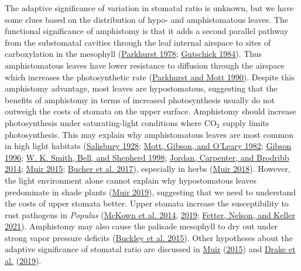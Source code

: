 \documentclass[
  10pt,
]{article}
\begin{document}
The adaptive significance of variation in stomatal ratio is unknown, but we have some clues based on the distribution of hypo- and amphistomatous leaves. The functional significance of amphistomy is that it adds a second parallel pathway from the substomatal cavities through the leaf internal airspace to sites of carboxylation in the mesophyll (\protect\hyperlink{ref-parkhurst_adaptive_1978}{Parkhurst 1978}; \protect\hyperlink{ref-gutschick_photosynthesis_1984}{Gutschick 1984}). Thus amphistomatous leaves have lower resistance to diffusion through the airspace which increases the photosynthetic rate (\protect\hyperlink{ref-parkhurst_intercellular_1990}{Parkhurst and Mott 1990}). Despite this amphistomy advantage, most leaves are hypostomatous, suggesting that the benefits of amphistomy in terms of increased photosynthesis usually do not outweigh the costs of stomata on the upper surface. Amphistomy should increase photosynthesis under saturating-light conditions where CO\(_2\) supply limits photosynthesis. This may explain why amphistomatous leaves are most common in high light habitats (\protect\hyperlink{ref-salisbury_i_1928}{Salisbury 1928}; \protect\hyperlink{ref-mott_adaptive_1982}{Mott, Gibson, and O'Leary 1982}; \protect\hyperlink{ref-gibson_structure-function_1996}{Gibson 1996}; \protect\hyperlink{ref-smith_associations_1998}{W. K. Smith, Bell, and Shepherd 1998}; \protect\hyperlink{ref-jordan_using_2014}{Jordan, Carpenter, and Brodribb 2014}; \protect\hyperlink{ref-muir_making_2015}{Muir 2015}; \protect\hyperlink{ref-bucher_stomatal_2017}{Bucher et al. 2017}), especially in herbs (\protect\hyperlink{ref-muir_light_2018}{Muir 2018}). However, the light environment alone cannot explain why hypostomatous leaves predominate in shade plants (\protect\hyperlink{ref-muir_is_2019}{Muir 2019}), suggesting that we need to understand the costs of upper stomata better. Upper stomata increase the susceptibility to rust pathogens in \emph{Populus} (\protect\hyperlink{ref-mckown_association_2014}{McKown et al. 2014}, \protect\hyperlink{ref-mckown_role_2019}{2019}; \protect\hyperlink{ref-fetter_growthdefense_2021}{Fetter, Nelson, and Keller 2021}). Amphistomy may also cause the palisade mesophyll to dry out under strong vapor pressure deficits (\protect\hyperlink{ref-buckley_how_2015}{Buckley et al. 2015}). Other hypotheses about the adaptive significance of stomatal ratio are discussed in \protect\hyperlink{ref-muir_making_2015}{Muir} (\protect\hyperlink{ref-muir_making_2015}{2015}) and \protect\hyperlink{ref-drake_two_2019}{Drake et al.} (\protect\hyperlink{ref-drake_two_2019}{2019}).
\end{document}
